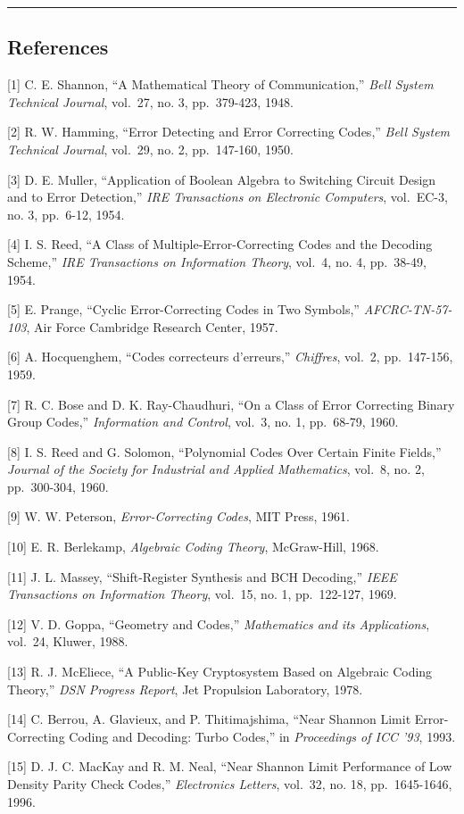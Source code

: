 \documentclass[
]{article}
\begin{document}
\begin{center}\rule{0.5\linewidth}{0.5pt}\end{center}

\subsection{References}\label{references}

{[}1{]} C. E. Shannon, ``A Mathematical Theory of Communication,''
\emph{Bell System Technical Journal}, vol.~27, no. 3, pp.~379-423, 1948.

{[}2{]} R. W. Hamming, ``Error Detecting and Error Correcting Codes,''
\emph{Bell System Technical Journal}, vol.~29, no. 2, pp.~147-160, 1950.

{[}3{]} D. E. Muller, ``Application of Boolean Algebra to Switching
Circuit Design and to Error Detection,'' \emph{IRE Transactions on
Electronic Computers}, vol.~EC-3, no. 3, pp.~6-12, 1954.

{[}4{]} I. S. Reed, ``A Class of Multiple-Error-Correcting Codes and the
Decoding Scheme,'' \emph{IRE Transactions on Information Theory},
vol.~4, no. 4, pp.~38-49, 1954.

{[}5{]} E. Prange, ``Cyclic Error-Correcting Codes in Two Symbols,''
\emph{AFCRC-TN-57-103}, Air Force Cambridge Research Center, 1957.

{[}6{]} A. Hocquenghem, ``Codes correcteurs d'erreurs,''
\emph{Chiffres}, vol.~2, pp.~147-156, 1959.

{[}7{]} R. C. Bose and D. K. Ray-Chaudhuri, ``On a Class of Error
Correcting Binary Group Codes,'' \emph{Information and Control}, vol.~3,
no. 1, pp.~68-79, 1960.

{[}8{]} I. S. Reed and G. Solomon, ``Polynomial Codes Over Certain
Finite Fields,'' \emph{Journal of the Society for Industrial and Applied
Mathematics}, vol.~8, no. 2, pp.~300-304, 1960.

{[}9{]} W. W. Peterson, \emph{Error-Correcting Codes}, MIT Press, 1961.

{[}10{]} E. R. Berlekamp, \emph{Algebraic Coding Theory}, McGraw-Hill,
1968.

{[}11{]} J. L. Massey, ``Shift-Register Synthesis and BCH Decoding,''
\emph{IEEE Transactions on Information Theory}, vol.~15, no. 1,
pp.~122-127, 1969.

{[}12{]} V. D. Goppa, ``Geometry and Codes,'' \emph{Mathematics and its
Applications}, vol.~24, Kluwer, 1988.

{[}13{]} R. J. McEliece, ``A Public-Key Cryptosystem Based on Algebraic
Coding Theory,'' \emph{DSN Progress Report}, Jet Propulsion Laboratory,
1978.

{[}14{]} C. Berrou, A. Glavieux, and P. Thitimajshima, ``Near Shannon
Limit Error-Correcting Coding and Decoding: Turbo Codes,'' in
\emph{Proceedings of ICC '93}, 1993.

{[}15{]} D. J. C. MacKay and R. M. Neal, ``Near Shannon Limit
Performance of Low Density Parity Check Codes,'' \emph{Electronics
Letters}, vol.~32, no. 18, pp.~1645-1646, 1996.
\end{document}
